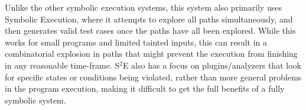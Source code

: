 Unlike the other symbolic execution systems, this system also primarily uses
Symbolic Execution, where it attempts to explore all paths simultaneously, and
then generates valid test cases once the paths have all been explored. While
this works for small programs and limited tainted inputs, this can result in a
combinatorial explosion in paths that might prevent the execution from finishing
in any reasonable time-frame. S$^2$E also has a focus on plugins/analyzers that
look for specific states or conditions being violated, rather than more general
problems in the program execution, making it difficult to get the full benefits
of a fully symbolic system.
